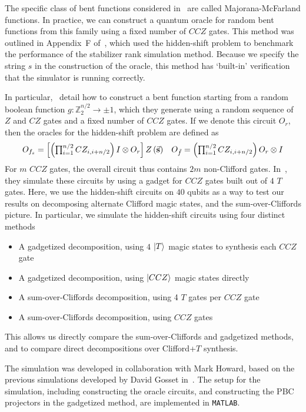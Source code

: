 The specific class of bent functions considered in~\cite{Roetteler2008} are called Majorana-McFarland functions. In practice, we can construct a quantum oracle for random bent functions from this family using a fixed number of $CCZ$ gates. This method was outlined in Appendix~F of~\cite{Bravyi2016}, which used the hidden-shift problem to benchmark the performance of the stabilizer rank simulation method. Because we specify the string $s$ in the construction of the oracle, this method has `built-in' verification that the simulator is running correctly.\par
In particular,~\cite{Bravyi2016} detail how to construct a bent function starting from a random boolean function $g:\mathbb{Z}_{2}^{n/2}\rightarrow \pm 1$, which they generate using a random sequence of $Z$ and $CZ$ gates and a fixed number of $CCZ$ gates. If we denote this circuit $O_{r}$, then the oracles for the hidden-shift problem are defined as
\begin{equation}
\begin{array}{l r}
 O_{f_{s}} = \left[\left(\prod_{i=1}^{n/2}CZ_{i,i+n/2}\right)I\otimes O_{r}\right] Z\left(\va{s}\right) & O_{\tilde{f}} = \left(\prod_{i=1}^{n/2}CZ_{i,i+n/2}\right)O_{r}\otimes I
\end{array}
\end{equation}
For $m$ $CCZ$ gates, the overall circuit thus contains $2m$ non-Clifford gates. In~\cite{Bravyi2016}, they simulate these circuits by using a gadget for $CCZ$ gates built out of $4$ $T$ gates. Here, we use the hidden-shift circuits on $40$ qubits as a way to test our results on decomposing alternate Clifford magic states, and the sum-over-Cliffords picture. In particular, we simulate the hidden-shift circuits using four distinct methods
\begin{itemize}
    \item A gadgetized decomposition, using $4$ $\ket{T}$ magic states to synthesis each $CCZ$ gate
    \item A gadgetized decomposition, using $\ket{CCZ}$ magic states directly
    \item A sum-over-Cliffords decomposition, using 4 $T$ gates per $CCZ$ gate
    \item A sum-over-Cliffords decomposition, using $CCZ$ gates
\end{itemize}
This allows us directly compare the sum-over-Cliffords and gadgetized methods, and to compare direct decompositions over Clifford+$T$ synthesis.\par
The simulation was developed in collaboration with Mark Howard, based on the previous simulations developed by David Gosset in~\cite{Bravyi2016}. The setup for the simulation, including constructing the oracle circuits, and constructing the PBC projectors in the gadgetized method, are implemented in \texttt{MATLAB}.\par
